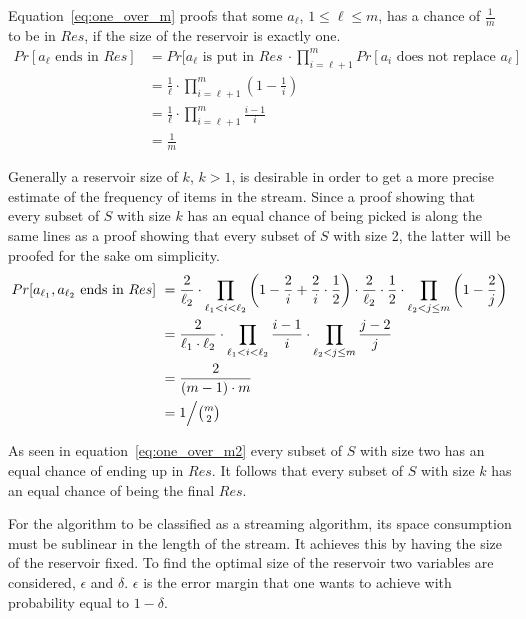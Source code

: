 Equation~\ref{eq:one_over_m} proofs that some \(a_\ell\), \(1 \le \ell \le m\), has a chance of \(\frac{1}{m}\) to be in \(Res\), if the size of the reservoir is exactly one.
\begin{equation}
	\label{eq:one_over_m}
	\begin{split}
	Pr[a_\ell \textrm{ ends in } Res]\ 
	& = Pr[a_\ell \textrm{ is put in } Res\ \cdot \prod_{i=\ell+1}^{m} Pr[a_i \textrm{ does not replace } a_\ell] \\
	& = \frac{1}{\ell} \cdot \prod_{i=\ell+1}^{m}\left(1-\frac{1}{i}\right) \\
	& = \frac{1}{\ell} \cdot \prod_{i=\ell+1}^{m}\frac{i-1}{i} \\
	& = \frac{1}{m}
	\end{split}
\end{equation}

Generally a reservoir size of \(k\), \(k > 1\), is desirable in order to get a more precise estimate of the frequency of items in the stream. Since a proof showing that every subset of \(S\) with size \(k\) has an equal chance of being picked is along the same lines as a proof showing that every subset of \(S\) with size 2, the latter will be proofed for the sake om simplicity.
\begin{equation}
	\label{eq:one_over_m2}
	\begin{split}
	Pr[a_{\ell_1}, a_{\ell_2} \textrm{ ends in } Res]\ 
	& = \frac{2}{\ell_2} \cdot \prod_{\ell_1<i<\ell_2} \left(1- \frac{2}{i} + \frac{2}{i} \cdot \frac{1}{2}\right) \cdot \frac{2}{\ell_2} \cdot \frac{1}{2} \cdot \prod_{\ell_2 < j \le m} \left( 1 - \frac{2}{j} \right)  \\
	& = \frac{2}{\ell_1 \cdot \ell_2} \cdot \prod_{\ell_1 < i < \ell_2} \frac{i-1}{i} \cdot \prod_{\ell_2 < j \le m} \frac{j-2}{j} \\
	& = \frac{2}{\left( m - 1 \right) \cdot m} \\
	& = 1\Big/\tbinom{m}{2}
	\end{split}
\end{equation}

As seen in equation~\ref{eq:one_over_m2} every subset of \(S\) with size two has an equal chance of ending up in \(Res\). It follows that every subset of \(S\) with size \(k\) has an equal chance of being the final \(Res\).

For the algorithm to be classified as a streaming algorithm, its space consumption must be sublinear in the length of the stream. It achieves this by having the size of the reservoir fixed. To find the optimal size of the reservoir two variables are considered, \(\epsilon\) and \(\delta\). \(\epsilon\) is the error margin that one wants to achieve with probability equal to \(1 - \delta\).

